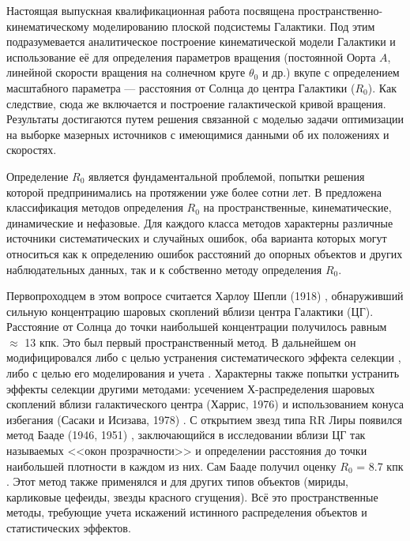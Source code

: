 \documentclass[a4paper, oneside, 14pt]{article}
\begin{document}
Настоящая выпускная квалификационная работа посвящена пространственно-кинематическому моделированию плоской подсистемы Галактики. Под этим подразумевается аналитическое построение кинематической модели Галактики и использование её для определения параметров вращения (постоянной Оорта $ A $, линейной скорости вращения на солнечном круге $ \theta_0 $ и др.) вкупе с определением масштабного параметра --- расстояния от Солнца до центра Галактики ($ R_0 $). Как следствие, сюда же включается и построение галактической кривой вращения. Результаты достигаются путем решения связанной с моделью задачи оптимизации на выборке мазерных источников с имеющимися данными об их положениях и скоростях.

Определение $ R_0 $ является фундаментальной проблемой, попытки решения которой предпринимались на протяжении уже более сотни лет. В \cite{N.2003} предложена классификация методов определения $ R_0 $ на пространственные, кинематические, динамические и нефазовые. Для каждого класса методов характерны различные источники систематических и случайных ошибок, оба варианта которых могут относиться как к определению ошибок расстояний до опорных объектов и других наблюдательных данных, так и к собственно методу определения $ R_0 $.

Первопроходцем в этом вопросе считается Харлоу Шепли (1918) \cite{S.1918}, обнаруживший сильную концентрацию шаровых скоплений вблизи центра Галактики (ЦГ). Расстояние от Солнца до точки наибольшей концентрации получилось равным $ \approx $ 13 кпк. Это был первый пространственный метод. В дальнейшем он модифицировался либо с целью устранения систематического эффекта селекции \cite{W.1975, F.W.1982, R.H.1989}, либо с целью его моделирования и учета \cite{R.P.D.F.1994}. Характерны также попытки устранить эффекты селекции другими методами: усечением Х-распределения шаровых скоплений вблизи галактического центра (Харрис, 1976) \cite{H.1976} и использованием конуса избегания (Сасаки и Исизава, 1978) \cite{S.I.1978}. С открытием звезд типа RR Лиры появился метод Бааде (1946, 1951) \cite{B.1946, B.1951}, заключающийся в исследовании вблизи ЦГ так называемых <<окон прозрачности>> и определении расстояния до точки наибольшей плотности в каждом из них. Сам Бааде получил оценку $ R_0 $ = 8.7 кпк \cite{B.1951}. Этот метод также применялся и для других типов объектов (мириды, карликовые цефеиды, звезды красного сгущения). Всё это пространственные методы, требующие учета искажений истинного распределения объектов и статистических эффектов.
\end{document}
